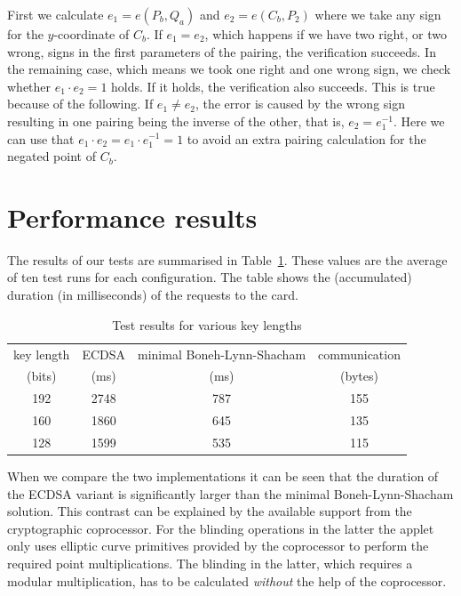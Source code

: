 First we calculate $e_1 = e(P_b, Q_a)$ and $e_2 = e(C_b, P_2)$ where we take
any sign for the $y$-coordinate of $C_b$. If $e_1 = e_2$, which happens if we
have two right, or two wrong, signs in the first parameters of the pairing, the
verification succeeds. In the remaining case, which means we took one right and
one wrong sign, we check whether $e_1 \cdot e_2 = 1$ holds. If it holds, the
verification also succeeds. This is true because of the following. If
$e_1 \neq e_2$, the error is caused by the wrong sign resulting in one pairing
being the inverse of the other, that is, $e_2 = e_1^{-1}$. Here we can use that
$e_1 \cdot e_2 = e_1 \cdot e_1^{-1} = 1$ to avoid an extra pairing calculation
for the negated point of $C_b$.

\section{Performance results}

The results of our tests are summarised in Table~\ref{tab:sbc-results}. These
values are the average of ten test runs for each configuration. The table shows
the (accumulated) duration (in milliseconds) of the requests to the card.

\begin{table}[b]
  \centering
  \caption{Test results for various key lengths}
  \label{tab:sbc-results}
  \renewcommand{\tabcolsep}{1.25mm}
  \renewcommand{\arraystretch}{1.25}
  \begin{tabular}{| c || c | c || c |}\hline
    key length & ECDSA & minimal Boneh-Lynn-Shacham & communication \\
    (bits) & (ms) & (ms) & (bytes) \\\hline\hline
    192 & 2748 & 787 & 155 \\\hline
    160 & 1860 & 645 & 135 \\\hline
    128 & 1599 & 535 & 115 \\\hline
  \end{tabular}
\end{table}

When we compare the two implementations it can be seen that the duration of the
ECDSA variant is significantly larger than the minimal Boneh-Lynn-Shacham
solution. This contrast can be explained by the available support from the
cryptographic coprocessor. For the blinding operations in the latter the applet
only uses elliptic curve primitives provided by the coprocessor to perform the
required point multiplications. The blinding in the latter, which requires a
modular multiplication, has to be calculated \emph{without} the help of the
coprocessor.

